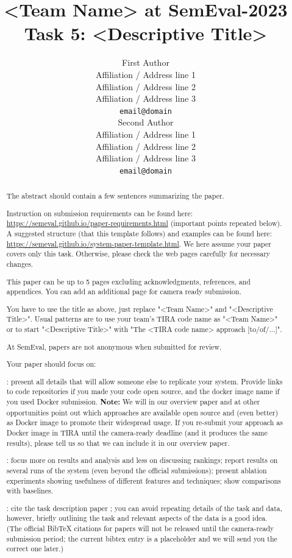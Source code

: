 \documentclass[11pt]{article}
\title{<Team Name> at SemEval-2023 Task 5: <Descriptive Title>}
\author{First Author \\
  Affiliation / Address line 1 \\
  Affiliation / Address line 2 \\
  Affiliation / Address line 3 \\
  \texttt{email@domain} \\\And
  Second Author \\
  Affiliation / Address line 1 \\
  Affiliation / Address line 2 \\
  Affiliation / Address line 3 \\
  \texttt{email@domain} \\}
\begin{document}
\maketitle
\begin{abstract}
The abstract should contain a few sentences summarizing the paper.

Instruction on submission requirements can be found here: \url{https://semeval.github.io/paper-requirements.html} (important points repeated below). A suggested structure (that this template follows) and examples can be found here: \url{https://semeval.github.io/system-paper-template.html}. We here assume your paper covers only this task. Otherwise, please check the web pages carefully for necessary changes.

This paper can be up to 5 pages excluding acknowledgments, references, and appendices. You can add an additional page for camera ready submission.

You have to use the title as above, just replace "<Team Name>" and "<Descriptive Title>". Usual patterns are to use your team's TIRA code name as "<Team Name>" or to start "<Descriptive Title>" with "The <TIRA code name> approach [to/of/...]".

At SemEval, papers are not anonymous when submitted for review.

Your paper should focus on:
\par{}: present all details that will allow someone else to replicate your system. Provide links to code repositories if you made your code open source, and the docker image name if you used Docker submission. {\bf Note:} We will in our overview paper and at other opportunities point out which approaches are available open source and (even better) as Docker image to promote their widespread usage. If you re-submit your approach as Docker image in TIRA until the camera-ready deadline (and it produces the same results), please tell us so that we can include it in our overview paper.
\par{}: focus more on results and analysis and less on discussing rankings; report results on several runs of the system (even beyond the official submissions); present ablation experiments showing usefulness of different features and techniques; show comparisons with baselines.
\par{}: cite the task description paper \cite{froebe:2023a}; you can avoid repeating details of the task and data, however, briefly outlining the task and relevant aspects of the data is a good idea. (The official BibTeX citations for papers will not be released until the camera-ready submission period; the current bibtex entry is a placeholder and we will send you the correct one later.)

\end{abstract}
\end{document}
